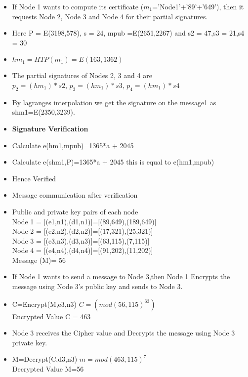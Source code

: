 \documentclass[11pt,a4paper]{llncs}
\begin{document}
    \begin{itemize}
    \item If Node 1 wants to compute its certificate ($m_1$='Node1'+'89'+'649'), then it requests Node 2, Node 3 and Node 4 for their partial signatures.
    
            \item Here P = E(3198,578), s = 24, mpub =E(2651,2267) and s2 = 47,s3 = 21,s4 = 30
            \item $hm_1 =  HTP(m_1) = E(163,1362)$
            \item The partial signatures of Nodes 2, 3 and 4 are \\
             $p_2=(hm_1)*{s2} $,
             $p_3=(hm_1)*{s3}  $,
$p_4=(hm_1)*{s4}  $
            \item By lagranges interpolation we get the signature on the message1 as shm1=E(2350,3239).
            \item \textbf{Signature Verification}
            \item Calculate  e(hm1,mpub)=1365*a + 2045
            \item Calculate e(shm1,P)=1365*a + 2045 this is equal to e(hm1,mpub)
            \item Hence Verified
            \item Message communication after verification
            
            
            \item Public and private key pairs of each node\\
            Node 1 = [(e1,n1),(d1,n1)]=[(89,649),(189,649)]\\
            Node 2 = [(e2,n2),(d2,n2)]=[(17,321),(25,321)]\\
            Node 3 = [(e3,n3),(d3,n3)]=[(63,115),(7,115)]\\
            Node 4 = [(e4,n4),(d4,n4)]=[(91,202),(11,202)]\\
            Message (M)= 56
        \item If Node 1 wants to send a message to Node 3,then Node 1 Encrypts the message using Node 3's public key and sends to Node 3.
            \item C=Encrypt(M,e3,n3) 
            $C= (mod(56,115)^{63})$\\
            Encrypted Value C = 463
            \item Node 3 receives the Cipher value and Decrypts the message using Node 3 private key.
            \item M=Decrypt(C,d3,n3) $m=mod(463,115)^7$\\
            Decrypted Value M=56
            
            
        \end{itemize}      
        
\end{document}
